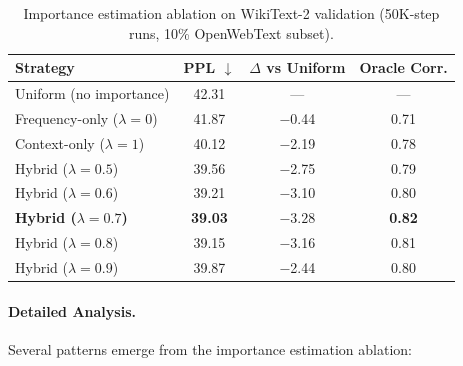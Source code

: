 \begin{table}[h]
\centering
\caption{Importance estimation ablation on WikiText-2 validation (50K-step runs, 10\% OpenWebText subset).}
\label{tab:imp-ablation-full}
\begin{tabular}{lccc}
\toprule
\textbf{Strategy} & \textbf{PPL} $\downarrow$ & \textbf{$\Delta$ vs Uniform} & \textbf{Oracle Corr.} \\
\midrule
Uniform (no importance) & 42.31 & --- & --- \\
Frequency-only ($\lambda=0$) & 41.87 & $-$0.44 & 0.71 \\
Context-only ($\lambda=1$) & 40.12 & $-$2.19 & 0.78 \\
Hybrid ($\lambda=0.5$) & 39.56 & $-$2.75 & 0.79 \\
Hybrid ($\lambda=0.6$) & 39.21 & $-$3.10 & 0.80 \\
\textbf{Hybrid ($\lambda=0.7$)} & \textbf{39.03} & $\mathbf{-3.28}$ & \textbf{0.82} \\
Hybrid ($\lambda=0.8$) & 39.15 & $-$3.16 & 0.81 \\
Hybrid ($\lambda=0.9$) & 39.87 & $-$2.44 & 0.80 \\
\bottomrule
\end{tabular}
\end{table}

\paragraph{Detailed Analysis.} Several patterns emerge from the importance estimation ablation:

